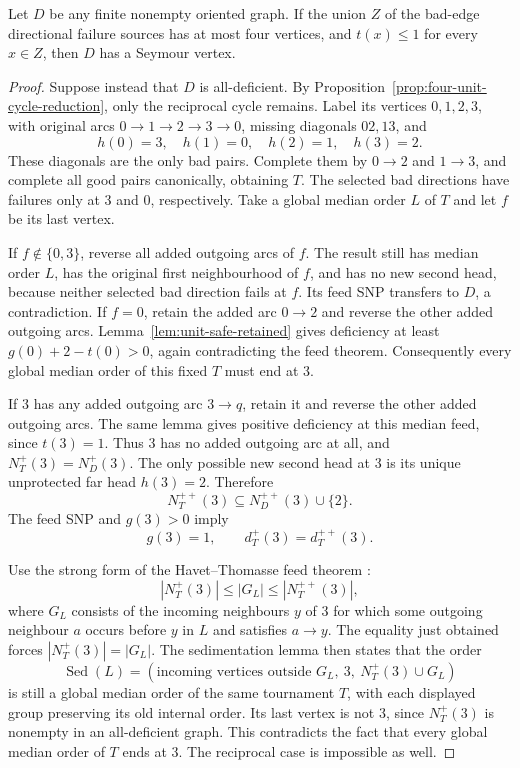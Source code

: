 \begin{theorem}
\label{thm:four-unit-failure-sources}
Let $D$ be any finite nonempty oriented graph. If the union $Z$ of
the bad-edge directional failure sources has at most four vertices,
and $t(x)\le1$ for every $x\in Z$, then $D$ has a Seymour vertex.
\end{theorem}
\begin{proof}
Suppose instead that $D$ is all-deficient. By
Proposition~\ref{prop:four-unit-cycle-reduction}, only the reciprocal
cycle remains. Label its vertices $0,1,2,3$, with original arcs
$0\to1\to2\to3\to0$, missing diagonals $02,13$, and
\[
 h(0)=3,\quad h(1)=0,\quad h(2)=1,\quad h(3)=2.
\]
These diagonals are the only bad pairs. Complete them by $0\to2$
and $1\to3$, and complete all good pairs canonically, obtaining $T$.
The selected bad directions have failures only at $3$ and $0$,
respectively. Take a global median order $L$ of $T$ and let $f$ be
its last vertex.

If $f\notin\{0,3\}$, reverse all added outgoing arcs of $f$. The
result still has median order $L$, has the original first neighbourhood
of $f$, and has no new second head, because neither selected bad
direction fails at $f$. Its feed SNP transfers to $D$, a contradiction.
If $f=0$, retain the added arc $0\to2$ and reverse the other added
outgoing arcs. Lemma~\ref{lem:unit-safe-retained} gives deficiency
at least $g(0)+2-t(0)>0$, again contradicting the feed theorem.
Consequently every global median order of this fixed $T$ must end at $3$.

If $3$ has any added outgoing arc $3\to q$, retain it and reverse
the other added outgoing arcs. The same lemma gives positive
deficiency at this median feed, since $t(3)=1$. Thus $3$ has no
added outgoing arc at all, and $N_T^+(3)=N_D^+(3)$.
The only possible new second head at $3$ is its unique unprotected
far head $h(3)=2$. Therefore
\[
 N_T^{++}(3)\subseteq N_D^{++}(3)\cup\{2\}.
\]
The feed SNP and $g(3)>0$ imply
\[
 g(3)=1,\qquad d_T^+(3)=d_T^{++}(3).
\]

Use the strong form of the Havet--Thomasse feed theorem
\cite[Theorem~1 and its proof]{HavetThomasse2000}:
\[
 |N_T^+(3)|\le |G_L|\le |N_T^{++}(3)|,
\]
where $G_L$ consists of the incoming neighbours $y$ of $3$ for which
some outgoing neighbour $a$ occurs before $y$ in $L$ and satisfies
$a\to y$. The equality just obtained forces
$|N_T^+(3)|=|G_L|$.
The sedimentation lemma \cite[Lemma~1]{HavetThomasse2000} then states
that the order
\[
 \operatorname{Sed}(L)=
 (\text{incoming vertices outside }G_L,\ 3,\ N_T^+(3)\cup G_L)
\]
is still a global median order of the same tournament $T$, with each
displayed group preserving its old internal order. Its last vertex
is not $3$, since $N_T^+(3)$ is nonempty in an all-deficient graph.
This contradicts the fact that every global median order of $T$
ends at $3$. The reciprocal case is impossible as well.
\end{proof}

